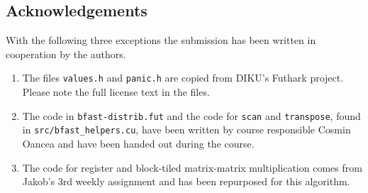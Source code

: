\subsection*{Acknowledgements}
With the following three exceptions the submission has been written in
cooperation by the authors.

\begin{enumerate}
\item The files \texttt{values.h} and \texttt{panic.h} are copied from DIKU's Futhark
project. Please note the full license text in the files.

\item The code in  \texttt{bfast-distrib.fut} and the code for \texttt{scan} and
    \texttt{transpose}, found in \texttt{src/bfast\_helpers.cu}, have been
    written by course responsible Cosmin Oancea and have been handed out during
    the course.

\item The code for register and block-tiled matrix-matrix multiplication comes
    from Jakob's 3rd weekly assignment and has been repurposed for this
    algorithm.
\end{enumerate}


